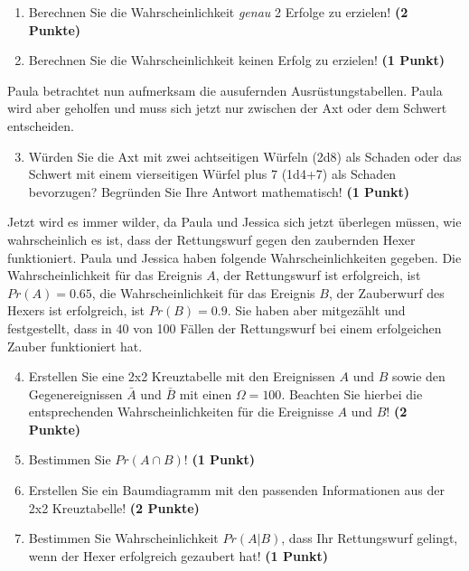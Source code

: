 \documentclass[a4paper, 9pt]{scrartcl}\usepackage[]{graphicx}\usepackage[]{xcolor}
\begin{document}
\begin{enumerate}
\item Berechnen Sie die Wahrscheinlichkeit \textit{genau} 2 Erfolge zu erzielen!  \textbf{(2 Punkte)}
\item Berechnen Sie die Wahrscheinlichkeit keinen Erfolg zu erzielen! \textbf{(1 Punkt)}
\end{enumerate}

Paula betrachtet nun aufmerksam die ausufernden Ausrüstungstabellen. Paula wird aber geholfen und muss sich jetzt nur zwischen der Axt oder dem Schwert entscheiden.

\begin{enumerate}
  \setcounter{enumi}{2}
\item Würden Sie die Axt mit zwei achtseitigen Würfeln (2d8) als Schaden oder das Schwert mit einem vierseitigen Würfel plus 7 (1d4+7) als Schaden bevorzugen? Begründen Sie Ihre Antwort mathematisch! \textbf{(1 Punkt)}
\end{enumerate}

Jetzt wird es immer wilder, da Paula und Jessica sich jetzt überlegen müssen, wie wahrscheinlich es ist, dass der Rettungswurf gegen den zaubernden Hexer funktioniert. Paula und Jessica haben folgende Wahrscheinlichkeiten gegeben. Die Wahrscheinlichkeit für das Ereignis $A$, der Rettungswurf ist erfolgreich, ist $Pr(A) = 0.65$, die Wahrscheinlichkeit für das Ereignis $B$, der Zauberwurf des Hexers ist erfolgreich, ist $Pr(B) = 0.9$. Sie haben aber mitgezählt und festgestellt, dass in $40$ von 100 Fällen der Rettungswurf bei einem erfolgeichen Zauber funktioniert hat.  

\begin{enumerate}
  \setcounter{enumi}{3}
\item Erstellen Sie eine 2x2 Kreuztabelle mit den Ereignissen $A$ und $B$ sowie den Gegenereignissen $\bar{A}$ und $\bar{B}$ mit einen $\Omega = 100$. Beachten Sie hierbei die entsprechenden Wahrscheinlichkeiten für die Ereignisse $A$ und $B$! \textbf{(2 Punkte)}
\item Bestimmen Sie $Pr(A \cap B)$! \textbf{(1 Punkt)}
\item Erstellen Sie ein Baumdiagramm mit den passenden Informationen aus der 2x2 Kreuztabelle! \textbf{(2 Punkte)}
\item Bestimmen Sie Wahrscheinlichkeit $Pr(A|B)$, dass Ihr Rettungswurf gelingt, wenn der Hexer erfolgreich gezaubert hat! \textbf{(1 Punkt)}
\end{enumerate}
\end{document}
